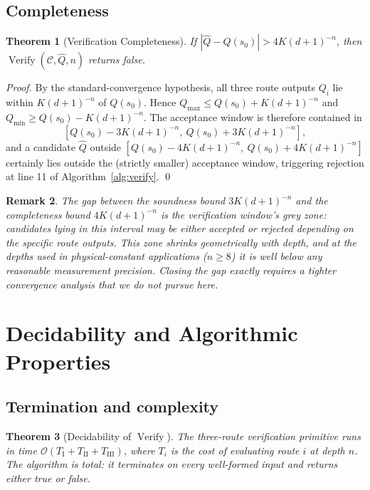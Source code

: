 \documentclass[twocolumn,11pt,a4paper]{article}
\newtheorem{theorem}{Theorem}[section]
\newtheorem{remark}[theorem]{Remark}
\DeclareMathOperator{\Verify}{Verify}
\newcommand{\Inv}{Q}
\newcommand{\Depth}{n}
\newcommand{\Dim}{d}
\newcommand{\Tolb}{K}
\begin{document}
\subsection{Completeness}

\begin{theorem}[Verification Completeness]
\label{thm:verification-complete}
If $|\hat\Inv - \Inv(s_0)| > 4\Tolb(\Dim+1)^{-\Depth}$, then $\Verify(\mathcal{C}, \hat\Inv, \Depth)$ returns false.
\end{theorem}

\begin{proof}
By the standard-convergence hypothesis, all three route outputs $\Inv_i$ lie within $\Tolb(\Dim+1)^{-\Depth}$ of $\Inv(s_0)$. Hence $\Inv_{\max} \leq \Inv(s_0) + \Tolb(\Dim+1)^{-\Depth}$ and $\Inv_{\min} \geq \Inv(s_0) - \Tolb(\Dim+1)^{-\Depth}$. The acceptance window is therefore contained in
\[
[\Inv(s_0) - 3\Tolb(\Dim+1)^{-\Depth},\ \Inv(s_0) + 3\Tolb(\Dim+1)^{-\Depth}],
\]
and a candidate $\hat\Inv$ outside $[\Inv(s_0) - 4\Tolb(\Dim+1)^{-\Depth},\ \Inv(s_0) + 4\Tolb(\Dim+1)^{-\Depth}]$ certainly lies outside the (strictly smaller) acceptance window, triggering rejection at line 11 of Algorithm~\ref{alg:verify}. \qed
\end{proof}

\begin{remark}
The gap between the soundness bound $3\Tolb(\Dim+1)^{-\Depth}$ and the completeness bound $4\Tolb(\Dim+1)^{-\Depth}$ is the verification window's grey zone: candidates lying in this interval may be either accepted or rejected depending on the specific route outputs. This zone shrinks geometrically with depth, and at the depths used in physical-constant applications ($\Depth \geq 8$) it is well below any reasonable measurement precision. Closing the gap exactly requires a tighter convergence analysis that we do not pursue here.
\end{remark}

\section{Decidability and Algorithmic Properties}
\label{sec:decidability}

\subsection{Termination and complexity}

\begin{theorem}[Decidability of $\Verify$]
\label{thm:decidability}
The three-route verification primitive runs in time $\mathcal{O}(T_{\mathrm{I}} + T_{\mathrm{II}} + T_{\mathrm{III}})$, where $T_i$ is the cost of evaluating route $i$ at depth $\Depth$. The algorithm is total: it terminates on every well-formed input and returns either true or false.
\end{theorem}
\end{document}

